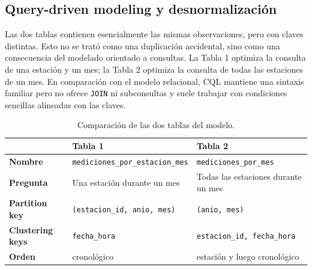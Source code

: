 \subsection{Query-driven modeling y desnormalización}

Las dos tablas contienen esencialmente las mismas observaciones, pero con claves distintas. Esto no se trató como una duplicación accidental, sino como una consecuencia del modelado orientado a consultas. La Tabla 1 optimiza la consulta de una estación y un mes; la Tabla 2 optimiza la consulta de todas las estaciones de un mes. En comparación con el modelo relacional, CQL mantiene una sintaxis familiar pero no ofrece \texttt{JOIN} ni subconsultas y suele trabajar con condiciones sencillas alineadas con las claves. \parencite[cap.~10, pp.~105--109]{sadalage2012}

\begin{table}[H]
\centering
\caption{Comparación de las dos tablas del modelo.}
\label{tab:modelo}
\begin{tabularx}{\linewidth}{>{\bfseries}p{3.2cm}XX}
\toprule
 & Tabla 1 & Tabla 2 \\
\midrule
Nombre & \texttt{mediciones\_por\_estacion\_mes} & \texttt{mediciones\_por\_mes} \\
Pregunta & Una estación durante un mes & Todas las estaciones durante un mes \\
Partition key & \texttt{(estacion\_id, anio, mes)} & \texttt{(anio, mes)} \\
Clustering keys & \texttt{fecha\_hora} & \texttt{estacion\_id, fecha\_hora} \\
Orden & cronológico & estación y luego cronológico \\
\bottomrule
\end{tabularx}
\end{table}
